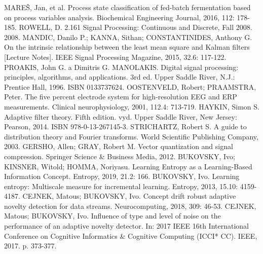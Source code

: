 \documentclass[11pt,twoside,openright]{report}
\begin{document}












\renewcommand{\bibname}{Publikace autora}
\begin{thebibliography}{A}


\end{thebibliography}


\renewcommand{\bibname}{Literatura}
\begin{thebibliography}{L} 
MAREŠ, Jan, et al. Process state classification of fed-batch fermentation based on process variables analysis. Biochemical Engineering Journal, 2016, 112: 178-185.
ROWELL, D. 2.161 Signal Processing: Continuous and Discrete, Fall 2008. 2008.
MANDIC, Danilo P.; KANNA, Sithan; CONSTANTINIDES, Anthony G. On the intrinsic relationship between the least mean square and Kalman filters [Lecture Notes]. IEEE Signal Processing Magazine, 2015, 32.6: 117-122.
PROAKIS, John G. a Dimitris G. MANOLAKIS. Digital signal processing: principles, algorithms, and applications. 3rd ed. Upper Saddle River, N.J.: Prentice Hall, 1996. ISBN 0133737624.
OOSTENVELD, Robert; PRAAMSTRA, Peter. The five percent electrode system for high-resolution EEG and ERP measurements. Clinical neurophysiology, 2001, 112.4: 713-719.
HAYKIN, Simon S. Adaptive filter theory. Fifth edition. vyd. Upper Saddle River, New Jersey: Pearson, 2014. ISBN 978-0-13-267145-3.
STRICHARTZ, Robert S. A guide to distribution theory and Fourier transforms. World Scientific Publishing Company, 2003.
GERSHO, Allen; GRAY, Robert M. Vector quantization and signal compression. Springer Science \& Business Media, 2012.
BUKOVSKY, Ivo; KINSNER, Witold; HOMMA, Noriyasu. Learning Entropy as a Learning-Based Information Concept. Entropy, 2019, 21.2: 166.
BUKOVSKY, Ivo. Learning entropy: Multiscale measure for incremental learning. Entropy, 2013, 15.10: 4159-4187.
CEJNEK, Matous; BUKOVSKY, Ivo. Concept drift robust adaptive novelty detection for data streams. Neurocomputing, 2018, 309: 46-53.
 CEJNEK, Matous; BUKOVSKY, Ivo. Influence of type and level of noise on the performance of an adaptive novelty detector. In: 2017 IEEE 16th International Conference on Cognitive Informatics \& Cognitive Computing (ICCI* CC). IEEE, 2017. p. 373-377.

\end{thebibliography}
\end{document}
